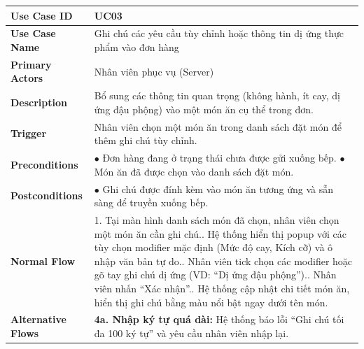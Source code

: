 \documentclass[12pt,a4paper]{article}
\begin{document}
\begin{longtable}{|L{3.5cm}|L{12.5cm}|}
\hline
\textbf{Use Case ID} & UC03 \\ \hline
\textbf{Use Case Name} & Ghi chú các yêu cầu tùy chỉnh hoặc thông tin dị ứng thực phẩm vào đơn hàng \\ \hline
\textbf{Primary Actors} & Nhân viên phục vụ (Server) \\ \hline
\textbf{Description} & Bổ sung các thông tin quan trọng (không hành, ít cay, dị ứng đậu phộng) vào một món ăn cụ thể trong đơn. \\ \hline
\textbf{Trigger} & Nhân viên chọn một món ăn trong danh sách đặt món để thêm ghi chú tùy chỉnh. \\ \hline
\textbf{Preconditions} &
$\bullet$ Đơn hàng đang ở trạng thái chưa được gửi xuống bếp.\newline
$\bullet$ Món ăn đã được chọn vào danh sách đặt món. \\ \hline
\textbf{Postconditions} & $\bullet$ Ghi chú được đính kèm vào món ăn tương ứng và sẵn sàng để truyền xuống bếp. \\ \hline
\textbf{Normal Flow} &
1. Tại màn hình danh sách món đã chọn, nhân viên chọn một món ăn cần ghi chú.. Hệ thống hiển thị popup với các tùy chọn modifier mặc định (Mức độ cay, Kích cỡ) và ô nhập văn bản tự do.. Nhân viên tick chọn các modifier hoặc gõ tay ghi chú dị ứng (VD: ``Dị ứng đậu phộng'').. Nhân viên nhấn ``Xác nhận''.. Hệ thống cập nhật chi tiết món ăn, hiển thị ghi chú bằng màu nổi bật ngay dưới tên món. \\ \hline
\textbf{Alternative Flows} &
\textbf{4a. Nhập ký tự quá dài:} Hệ thống báo lỗi ``Ghi chú tối đa 100 ký tự'' và yêu cầu nhân viên nhập lại. \\ \hline
\end{longtable}
\end{document}
